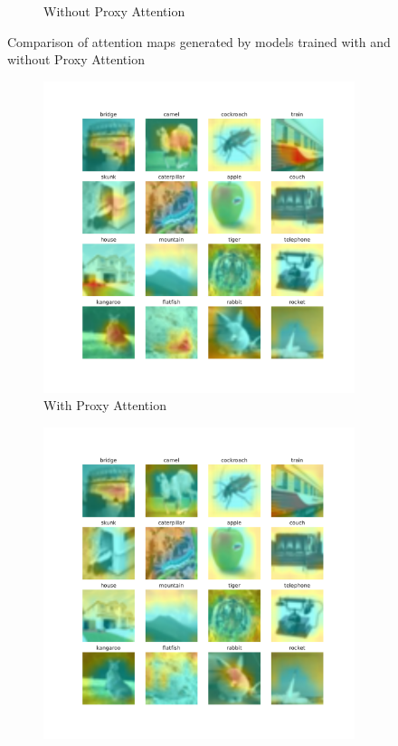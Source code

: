 \begin{figure}[H]
\begin{subfigure}[b]{.7\textwidth}
        \caption{Without Proxy Attention}
        \label{fig:noproxy2}
    \end{subfigure}
    \caption{Comparison of attention maps generated by models trained with and without Proxy Attention}
    \label{fig:attention2}
\end{figure}

\begin{figure}[H]
    \centering
    \begin{subfigure}[b]{0.7\textwidth}
        \includegraphics[width=\textwidth]{images/proxy_2.pdf}
        \caption{With Proxy Attention}
        \label{fig:proxy3}
    \end{subfigure}
    \hfill
    \begin{subfigure}[b]{.7\textwidth}
        \includegraphics[width=\textwidth]{images/noproxy_2.pdf}

\end{subfigure}
\end{figure}
